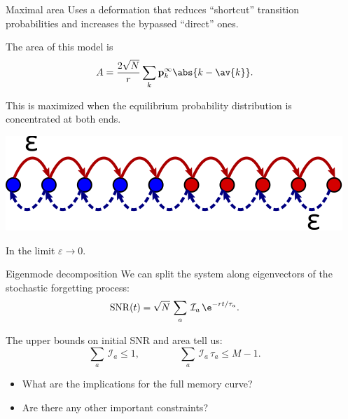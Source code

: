 \documentclass[final,hyperref={pdfpagelabels=false,bookmarks=false}]{beamer}
\DeclareMathOperator{\SNR}{SNR}
\newcommand{\eq}{\mathbf{p}^\infty}
\newcommand{\CI}{\mathcal{I}}
\begin{document}
\begin{frame}{}
\begin{columns}[t]
\begin{column}{0.29\linewidth}
\begin{block}{Maximal area}
 \vp Uses a deformation that reduces ``shortcut'' transition probabilities and increases the bypassed ``direct'' ones.

 \vp The area of this model is
 \begin{equation*}
   A = \frac{2\sqrt{N}}{r}\sum_k \eq_k \abs{k-\av{k}}.
 \end{equation*}

 \vp This is maximized when the equilibrium probability distribution is concentrated at both ends.

   \vp
   \begin{center}
     \includegraphics[width=0.35\linewidth]{multistate_sticky.svg}
   \end{center}
   In the limit $\varepsilon\to0$.
%
\end{block}



\begin{block}{Eigenmode decomposition}
%
 We can split the system along eigenvectors of the stochastic forgetting process:
 \begin{equation*}
   \SNR(t) = \sqrt{N} \, \sum_a \, \CI_a \, \e^{-rt/\tau_a}.
 \end{equation*}

 \vp The upper bounds on initial SNR and area tell us:
 \begin{equation*}
   \sum_a \, \CI_a \leq 1,
   \qquad\qquad
   \sum_a \, \CI_a \, \tau_a \leq M-1.
 \end{equation*}

 \vp \begin{itemize}
   \item What are the implications for the full memory curve?
   \item Are there any other important constraints?
 \end{itemize}
%
\end{block}




\end{column}

\begin{column}{0.33\linewidth}



\end{column}
\end{columns}
\end{frame}
\end{document}
